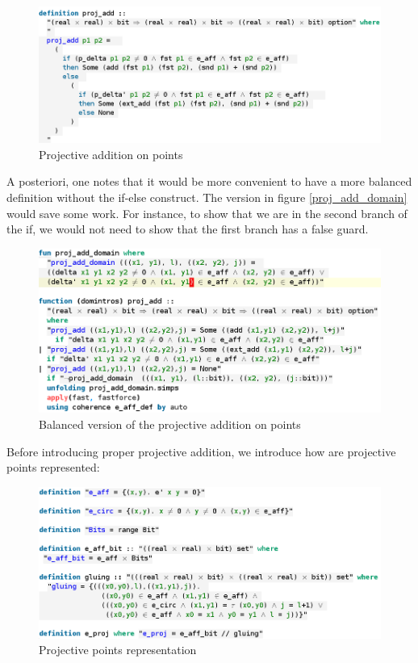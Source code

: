 \begin{figure}[!htbp]
	\centering
	\includegraphics[width=\linewidth,height=\textheight,keepaspectratio]{img/proj_add.png}
	\caption{Projective addition on points}
	\label{fig:proj_add}
\end{figure}

A posteriori, one notes that it would be more convenient to have a more balanced definition without the if-else construct. The version in figure \ref{proj_add_domain} would save some work. For instance, to show that we are in the second branch of the if, we would not need to show that the first branch has a false guard.

\begin{figure}[!htbp]
	\centering
	\includegraphics[width=\linewidth,height=\textheight,keepaspectratio]{img/proj_add_domain.png}
	\caption{Balanced version of the projective addition on points}
	\label{fig:proj_add_domain}
\end{figure}

Before introducing proper projective addition, we introduce how are projective points represented:

\begin{figure}[!htbp]
	\centering
	\includegraphics[width=\linewidth,height=\textheight,keepaspectratio]{img/e_proj.png}
	\caption{Projective points representation}
	\label{fig:e_proj}
\end{figure}

